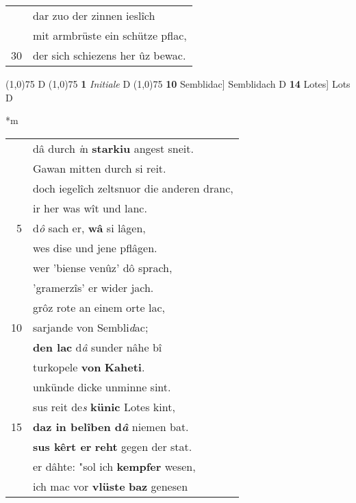 \documentclass[8pt,a4paper,notitlepage]{article}
\begin{document}
\begin{table}[ht]
\begin{minipage}[t]{0.5\linewidth}
\begin{tabular}{rl}
 & dar zuo der zinnen ieslîch\\ 
 & mit armbrüste ein schütze pflac,\\ 
30 & der sich schiezens her ûz bewac.\\ 
\end{tabular}
\scriptsize
\line(1,0){75} \newline
D \newline
\line(1,0){75} \newline
\textbf{1} \textit{Initiale} D  \newline
\line(1,0){75} \newline
\textbf{10} Semblidac] Semblidach D \textbf{14} Lotes] Lots D \newline
\end{minipage}
\hspace{0.5cm}
\begin{minipage}[t]{0.5\linewidth}
\small
\begin{center}*m
\end{center}
\begin{tabular}{rl}
 & dâ durch \textit{i}n \textbf{starkiu} angest sneit.\\ 
 & Gawan mitten durch si reit.\\ 
 & doch iegelîch zeltsnuor die anderen dranc,\\ 
 & ir her was wît und lanc.\\ 
5 & d\textit{ô} sach er, \textbf{wâ} si lâgen,\\ 
 & wes dise und jene pflâgen.\\ 
 & wer 'biense venûz' dô sprach,\\ 
 & 'gramerzîs' er wider jach.\\ 
 & grôz rote an einem orte lac,\\ 
10 & sarjande von Sembli\textit{d}ac;\\ 
 & \textbf{den lac} d\textit{â} sunder nâhe bî\\ 
 & turkopele \textbf{von} \textbf{Kaheti}.\\ 
 & unkünde dicke unminne sint.\\ 
 & sus reit de\textit{s} \textbf{künic} Lotes kint,\\ 
15 & \textbf{daz in belîben d\textit{â}} niemen bat.\\ 
 & \textbf{sus kêrt er} \textbf{reht} gegen der stat.\\ 
 & er dâhte: "sol ich \textbf{kempfer} wesen,\\ 
 & ich mac vor \textbf{vlüste} \textbf{baz} genesen\\ 

\end{tabular}
\end{minipage}
\end{table}
\end{document}
